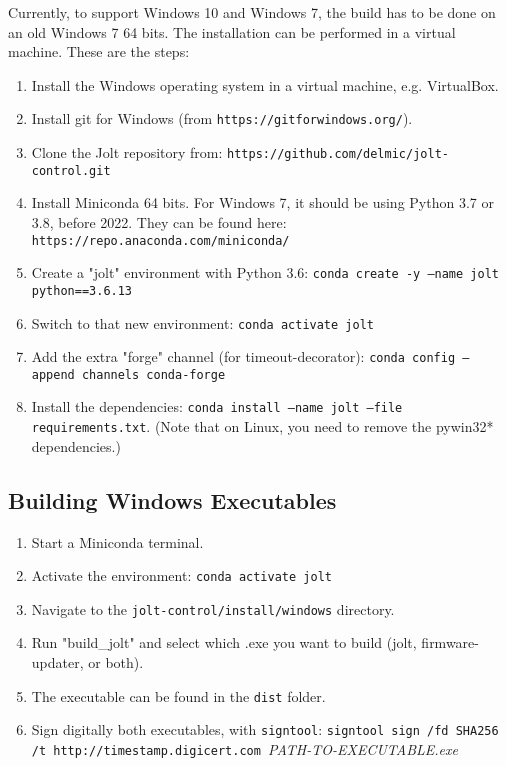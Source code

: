 \documentclass[]{article}
\begin{document}
Currently, to support Windows 10 and Windows 7, the build has to be done on an old Windows 7 64 bits.
The installation can be performed in a virtual machine.
These are the steps:
\begin{enumerate}
	\item Install the Windows operating system in a virtual machine, e.g. VirtualBox.
	\item Install git for Windows (from \texttt{https://gitforwindows.org/}).
	\item Clone the Jolt repository from: \texttt{https://github.com/delmic/jolt-control.git}
	\item Install Miniconda 64 bits. For Windows 7, it should be using Python 3.7 or 3.8, before 2022. They can be found here: \texttt{https://repo.anaconda.com/miniconda/}
	\item Create a "jolt" environment with Python 3.6: \texttt{conda create -y --name jolt python==3.6.13}
	\item Switch to that new environment: \texttt{conda activate jolt}
	\item Add the extra "forge" channel (for timeout-decorator): \texttt{conda config --append channels conda-forge}
	\item Install the dependencies: \texttt{conda install --name jolt --file requirements.txt}. (Note that on Linux, you need to remove the pywin32* dependencies.)
\end{enumerate}

\subsection{Building Windows Executables}
\begin{enumerate}
	\item Start a Miniconda terminal.
	\item Activate the environment: \texttt{conda activate jolt}
	\item Navigate to the \texttt{jolt-control/install/windows} directory.
	\item Run "build\_jolt" and select which .exe you want to build (jolt, firmware-updater, or both).
	\item The executable can be found in the \texttt{dist} folder.
	\item Sign digitally both executables, with \texttt{signtool}: \texttt{signtool sign /fd SHA256 /t http://timestamp.digicert.com }\emph{PATH-TO-EXECUTABLE.exe}
\end{enumerate}
\end{document}
